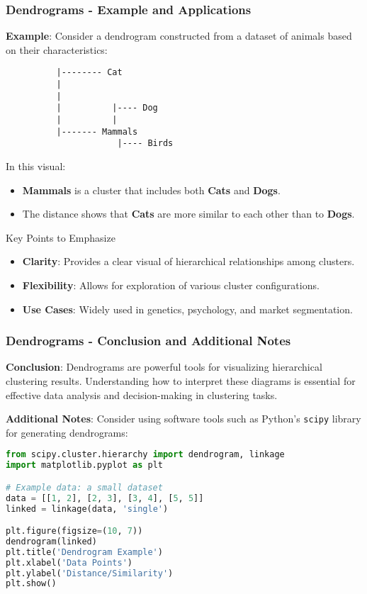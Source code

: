 \documentclass[aspectratio=169]{beamer}
\begin{document}
\begin{frame}[fragile]
    \frametitle{Dendrograms - Example and Applications}
    \textbf{Example}:
    Consider a dendrogram constructed from a dataset of animals based on their characteristics:
    
    \begin{verbatim}
          |-------- Cat
          |
          |                   
          |          |---- Dog
          |          |
          |------- Mammals
                      |---- Birds
    \end{verbatim}
    In this visual:
    \begin{itemize}
        \item \textbf{Mammals} is a cluster that includes both \textbf{Cats} and \textbf{Dogs}.
        \item The distance shows that \textbf{Cats} are more similar to each other than to \textbf{Dogs}.
    \end{itemize}
    
    \begin{block}{Key Points to Emphasize}
        \begin{itemize}
            \item \textbf{Clarity}: Provides a clear visual of hierarchical relationships among clusters.
            \item \textbf{Flexibility}: Allows for exploration of various cluster configurations.
            \item \textbf{Use Cases}: Widely used in genetics, psychology, and market segmentation.
        \end{itemize}
    \end{block}
\end{frame}

\begin{frame}[fragile]
    \frametitle{Dendrograms - Conclusion and Additional Notes}
    \textbf{Conclusion}:
    Dendrograms are powerful tools for visualizing hierarchical clustering results. Understanding how to interpret these diagrams is essential for effective data analysis and decision-making in clustering tasks.
    
    \textbf{Additional Notes}:
    Consider using software tools such as Python’s \texttt{scipy} library for generating dendrograms:
    \begin{lstlisting}[language=Python]
from scipy.cluster.hierarchy import dendrogram, linkage
import matplotlib.pyplot as plt

# Example data: a small dataset
data = [[1, 2], [2, 3], [3, 4], [5, 5]]
linked = linkage(data, 'single')

plt.figure(figsize=(10, 7))
dendrogram(linked)
plt.title('Dendrogram Example')
plt.xlabel('Data Points')
plt.ylabel('Distance/Similarity')
plt.show()
    \end{lstlisting}
\end{frame}
\end{document}
